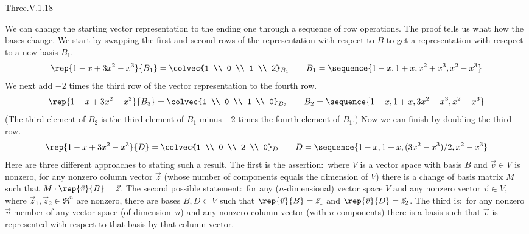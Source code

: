 \begin{ans}{Three.V.1.18}
      \begin{exparts}
        \partsitem We can change the starting vector representation
          to the ending one through a sequence of row operations.
          The proof tells us what how the bases change.
          We start by swapping the first and second rows
          of the representation with respect to $B$ to get a representation
          with resepect to a new basis $B_1$.
          \begin{equation*}
            \rep{1-x+3x^2-x^3}{B_1}=
              \colvec{1 \\ 0 \\ 1 \\ 2}_{B_1}
            \qquad
            B_1=\sequence{1-x,1+x,x^2+x^3,x^2-x^3}
          \end{equation*}
          We next add \( -2 \) times the third row of the vector
          representation to the fourth row.
          \begin{equation*}
            \rep{1-x+3x^2-x^3}{B_3}=
              \colvec{1 \\ 0 \\ 1 \\ 0}_{B_2}
            \qquad
            B_2=\sequence{1-x,1+x,3x^2-x^3,x^2-x^3}
          \end{equation*}
          (The third element of \( B_2 \) is the third element of
          \( B_1 \) minus \( -2 \) times the fourth element of $B_1$.)
          Now we can finish by doubling the third row.
          \begin{equation*}
            \rep{1-x+3x^2-x^3}{D}=
              \colvec{1 \\ 0 \\ 2 \\ 0}_{D}
            \qquad
            D=\sequence{1-x,1+x,(3x^2-x^3)/2,x^2-x^3}
          \end{equation*}
        \partsitem
          Here are three different approaches to stating such a result.
          The first is the assertion:~where $V$ is a vector space with
          basis $B$ and $\vec{v}\in V$ is nonzero, for any nonzero column
          vector $\vec{z}$
          (whose number of components equals the dimension of $V$)
          there is a change of basis matrix $M$ such that
          $M\cdot \rep{\vec{v}}{B}=\vec{z}$.
          The second possible statement:~for any ($n$-dimensional)
          vector space $V$ and any nonzero
          vector \( \vec{v}\in V \), where \( \vec{z}_1, \vec{z}_2\in\Re^n \)
          are nonzero, there are bases \( B, D\subset V \) such that
          \( \rep{\vec{v}}{B}=\vec{z}_1 \) and
          \( \rep{\vec{v}}{D}=\vec{z}_2 \).
          The third is:~for any nonzero $\vec{v}$ member of
          any vector space (of dimension~$n$) and any nonzero column vector
          (with $n$ components) there is a basis such that $\vec{v}$ is
          represented with respect to that basis by that column vector.


\end{exparts}
\end{ans}
